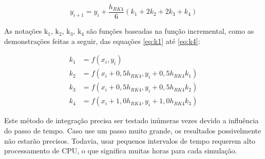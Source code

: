 \begin{equation}
    \label{eq:rk4-completo}
    y_{i+1} = y_{i} + \frac{h_{RK4}}{6}(k_{1}+2k_{2}+2k_{3}+k_{4})
\end{equation}

As notações $\text{k}_{1}$, $\text{k}_{2}$, $\text{k}_{3}$, $\text{k}_{4}$ são funções baseadas na função incremental, como as demonstrações feitas a seguir, das equações \ref{eq:k1} até \ref{eq:k4}:

\begin{subequations}\label{eq:rk4-termos-k1-ate-k4}
\begin{align}
    \label{eq:k1}
    k_{1} &= f(x_{i},y_{i}) \\
    \label{eq:k2}
    k_{2} &= f(x_{i}+0,5h_{RK4},y_{i}+0,5h_{RK4}k_{1}) \\
    \label{eq:k3}
    k_{3} &= f(x_{i}+0,5h_{RK4},y_{i}+0,5h_{RK4}k_{2}) \\
    \label{eq:k4}
    k_{4} &= f(x_{i}+1,0h_{RK4},y_{i}+1,0h_{RK4}k_{3}) 
\end{align}
\end{subequations}

Este método de integração precisa ser testado inúmeras vezes devido a influência do passo de tempo. Caso use um passo muito grande, os resultados possivelmente não estarão precisos. Todavia, usar pequenos intervalos de tempo requerem alto processamento de CPU, o que significa muitas horas para cada simulação.